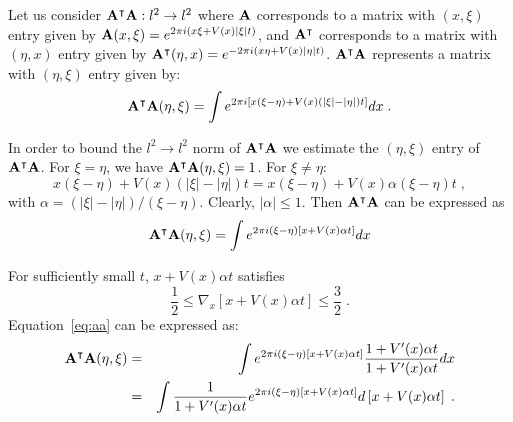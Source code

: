Let us consider $\mathbf{A}^\intercal\mathbf{A}: l^2 \to l^2$ where $\mathbf{A}$ corresponds to a
matrix with $(x,\xi)$ entry given by 
$\mathbf{A}(x,\xi) = e^{ 2\pi i(x \xi+V(x)|\xi|t)}$,
and $\mathbf{A}^\intercal$ corresponds to a matrix with $(\eta,x)$ entry given by
$\mathbf{A}^\intercal(\eta,x) = e^{ -2\pi i(x \eta+V(x)|\eta|t)}$.
$\mathbf{A}^\intercal\mathbf{A}$ represents a matrix with $(\eta,\xi)$ entry given by:
\begin{equation}
\mathbf{A}^\intercal\mathbf{A}(\eta,\xi) = \int e^{ 2\pi i[x(\xi-\eta)+V(x)(|\xi|-|\eta|)t]} dx\; .
\end{equation}

In order to bound the $ l^2 \to l^2$ norm of $\mathbf{A}^\intercal\mathbf{A}$ we
estimate the $(\eta,\xi)$ entry of $\mathbf{A}^\intercal\mathbf{A}$. For $\xi = \eta$,
we have $\mathbf{A}^\intercal\mathbf{A}(\eta,\xi) = 1$. For $\xi \neq \eta$:
\begin{equation}
x(\xi-\eta)+V(x)(|\xi|-|\eta|)t = x(\xi-\eta)+V(x)\alpha(\xi-\eta)t \; ,
\end{equation}
with $\alpha = (|\xi|-|\eta|)/(\xi-\eta)$. Clearly, $|\alpha| \leq 1
$. Then $\mathbf{A}^\intercal\mathbf{A}$ can be expressed as
\begin{equation}
\label{eq:aa}
\mathbf{A}^\intercal\mathbf{A}(\eta,\xi) = \int e^{2\pi i(\xi-\eta)[x+V(x)\alpha t]}dx
\end{equation}

For sufficiently small $t$, $x+V(x)\alpha t$ satisfies
\begin{equation}
\label{eq:conf}
\frac{1}{2} \leq \nabla_x\left[x+V(x)\alpha t\right] \leq \frac{3}{2} \; .
\end{equation}
Equation~\ref{eq:aa} can be expressed as:
\begin{eqnarray}
\label{eq:aa2}
\mathbf{A}^{\intercal}\mathbf{A}(\eta,\xi) &=& \int e^{2\pi i(\xi-\eta)[x+V(x)\alpha t]}\frac{1+V^{\prime}(x)\alpha t}{1+V^{\prime}(x)\alpha t} dx \\
&=& \int \frac{1}{1+V^{\prime}(x)\alpha t} e^{2\pi i(\xi-\eta)[x+V(x)\alpha t]} d\left[ x + V(x)\alpha t \right] \; . \nonumber
\end{eqnarray}

